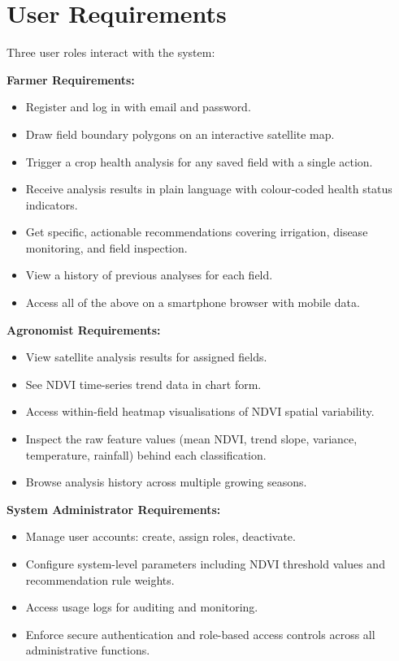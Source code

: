 \documentclass[12pt,a4paper]{report}
\begin{document}
\section{User Requirements}

Three user roles interact with the system:

\noindent\textbf{Farmer Requirements:}
\begin{itemize}[leftmargin=2cm]
  \item Register and log in with email and password.
  \item Draw field boundary polygons on an interactive satellite map.
  \item Trigger a crop health analysis for any saved field with a single action.
  \item Receive analysis results in plain language with colour-coded health status indicators.
  \item Get specific, actionable recommendations covering irrigation, disease monitoring, and field inspection.
  \item View a history of previous analyses for each field.
  \item Access all of the above on a smartphone browser with mobile data.
\end{itemize}

\noindent\textbf{Agronomist Requirements:}
\begin{itemize}[leftmargin=2cm]
  \item View satellite analysis results for assigned fields.
  \item See NDVI time-series trend data in chart form.
  \item Access within-field heatmap visualisations of NDVI spatial variability.
  \item Inspect the raw feature values (mean NDVI, trend slope, variance, temperature, rainfall) behind each classification.
  \item Browse analysis history across multiple growing seasons.
\end{itemize}

\noindent\textbf{System Administrator Requirements:}
\begin{itemize}[leftmargin=2cm]
  \item Manage user accounts: create, assign roles, deactivate.
  \item Configure system-level parameters including NDVI threshold values and recommendation rule weights.
  \item Access usage logs for auditing and monitoring.
  \item Enforce secure authentication and role-based access controls across all administrative functions.
\end{itemize}
\end{document}
